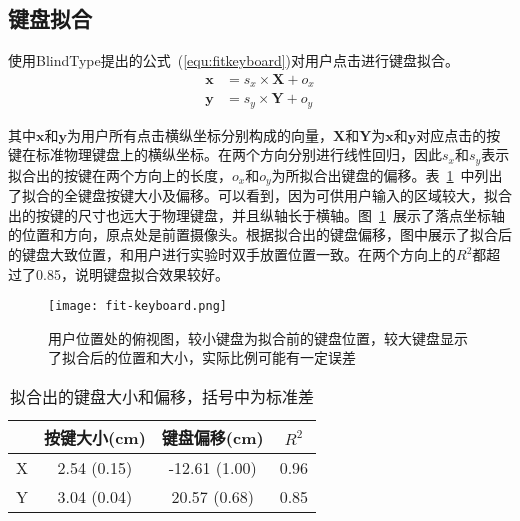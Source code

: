 \subsection{键盘拟合}
使用BlindType\cite{2017blindtype}提出的公式~(\ref{equ:fitkeyboard})对用户点击进行键盘拟合。
\begin{equation}
  \label{equ:fitkeyboard}
  \begin{aligned}
  \textbf{x} &= s_{x} \times \textbf{X} + o_{x} \\
  \textbf{y} &= s_{y} \times \textbf{Y} + o_{y}
  \end{aligned}
\end{equation}

其中$\textbf{x}$和$\textbf{y}$为用户所有点击横纵坐标分别构成的向量，$\textbf{X}$和$\textbf{Y}$为$\textbf{x}$和$\textbf{y}$对应点击的按键在标准物理键盘上的横纵坐标。在两个方向分别进行线性回归，因此$s_{x}$和$s_{y}$表示拟合出的按键在两个方向上的长度，$o_{x}$和$o_{y}$为所拟合出键盘的偏移。表~\ref{tab:fitkeyboard}~中列出了拟合的全键盘按键大小及偏移。可以看到，因为可供用户输入的区域较大，拟合出的按键的尺寸也远大于物理键盘，并且纵轴长于横轴。图~\ref{fig:fitkeyboard}~展示了落点坐标轴的位置和方向，原点处是前置摄像头。根据拟合出的键盘偏移，图中展示了拟合后的键盘大致位置，和用户进行实验时双手放置位置一致。在两个方向上的$R^{2}$都超过了0.85，说明键盘拟合效果较好。

\begin{figure}[h] %
  \centering
  \texttt{[image: fit-keyboard.png]}
  \caption{用户位置处的俯视图，较小键盘为拟合前的键盘位置，较大键盘显示了拟合后的位置和大小，实际比例可能有一定误差}
  \label{fig:fitkeyboard}
\end{figure}

\begin{table}[htb]
  \centering
  \begin{minipage}[t]{0.55\linewidth} %
  \caption[拟合出的键盘参数]{拟合出的键盘大小和偏移，括号中为标准差}
  \label{tab:fitkeyboard}
    \centering
    \begin{tabularx}{\linewidth}{cccc}
      \toprule[1.5pt]
      & 按键大小(cm) & 键盘偏移(cm) & $R^{2}$ \\\midrule[1pt]
      X & 2.54 (0.15) & -12.61 (1.00) & 0.96 \\
      Y & 3.04 (0.04) & 20.57 (0.68) & 0.85\\
      \bottomrule[1.5pt]
    \end{tabularx}
  \end{minipage}
\end{table}

